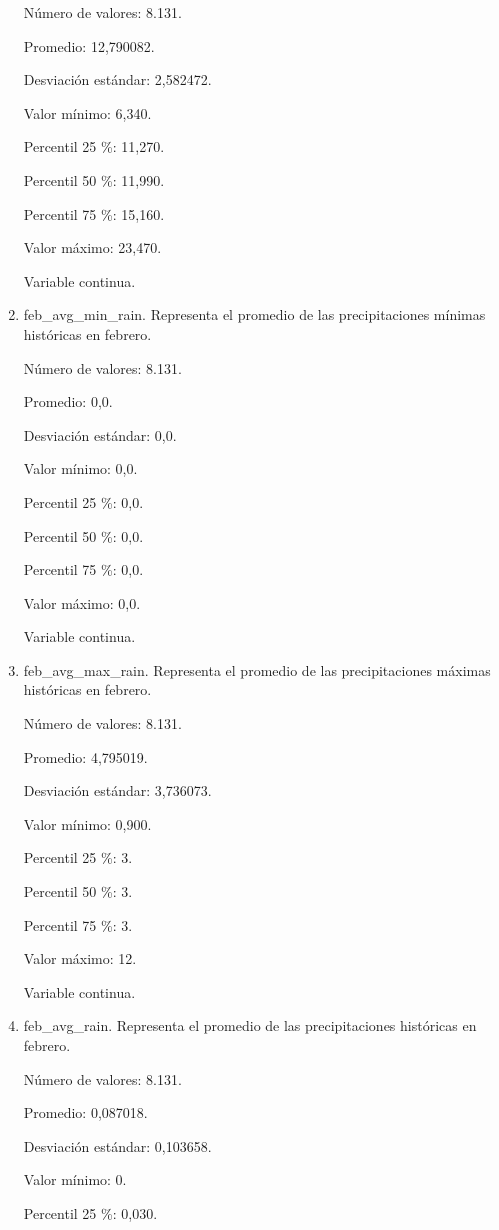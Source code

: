 \begin{enumerate}
	Número de valores: 8.131.
	
	Promedio: 12,790082.
	
	Desviación estándar: 2,582472.
	
	Valor mínimo: 6,340.
	
	Percentil 25 \%: 11,270.
	
	Percentil 50 \%: 11,990.
	
	Percentil 75 \%: 15,160.
	
	Valor máximo: 23,470.
	
	Variable continua.

	\item feb\_avg\_min\_rain. Representa el promedio de las precipitaciones mínimas históricas en febrero.
	
	Número de valores: 8.131.
	
	Promedio: 0,0.
	
	Desviación estándar: 0,0.
	
	Valor mínimo: 0,0.
	
	Percentil 25 \%: 0,0.
	
	Percentil 50 \%: 0,0.
	
	Percentil 75 \%: 0,0.
	
	Valor máximo: 0,0.
	
	Variable continua.

	\item feb\_avg\_max\_rain. Representa el promedio de las precipitaciones máximas históricas en febrero.
	
	Número de valores: 8.131.
	
	Promedio: 4,795019.
	
	Desviación estándar: 3,736073.
	
	Valor mínimo: 0,900.
	
	Percentil 25 \%: 3.
	
	Percentil 50 \%: 3.
	
	Percentil 75 \%: 3.
	
	Valor máximo: 12.
	
	Variable continua.

	\item feb\_avg\_rain. Representa el promedio de las precipitaciones históricas en febrero.
	
	Número de valores: 8.131.
	
	Promedio: 0,087018.
	
	Desviación estándar: 0,103658.
	
	Valor mínimo: 0.
	
	Percentil 25 \%: 0,030.
	

\end{enumerate}
